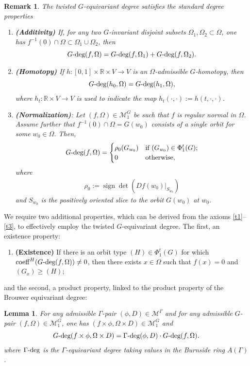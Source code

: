 \documentclass[twoside,11pt]{article}
\def\br{{\mathbb{R}}}
\def\gdeg{G\text{\rm -deg}}
\def\Om{\Omega}
\newtheorem{lemma}[theorem]{Lemma}
\newtheorem{remark}[theorem]{Remark}
\begin{document}
\begin{remark} \rm
The twisted $G$-equivariant degree satisfies the standard degree properties
\begin{enumerate}[label=($T_\arabic*$)]
\item\label{t1} {\bf (Additivity)} If, for any two $G$-invariant disjoint subsets $\Om_1,\Om_2 \subset \Om$, one has $f^{-1}(0) \cap \Om \subset \Om_1 \cup \Om_2$, then
\[
\gdeg(f,\Om) = \gdeg(f,\Om_1) + \gdeg(f,\Om_2).
\]
\item\label{t2} {\bf (Homotopy)} If $h: [0,1] \times \br \times V \rightarrow V$ is an $\Om$-admissible $G$-homotopy, then
\[
\gdeg(h_0,\Om) = \gdeg(h_1,\Om),
\]
where $h_t: \br \times V \rightarrow V$ is used to indicate the map $h_t(\cdot, \cdot) := h(t, \cdot,\cdot)$.
\item\label{t3}
{\bf (Normalization)}: Let $(f, \Omega) \in \mathcal{M}_1^{G}$ be such that $f$ is regular normal in $\Omega$. Assume further that $f^{-1}(0) \cap \Omega = G(w_0)$ consists of a single orbit for some $w_0 \in \Omega$. Then,
\begin{align*}
    \gdeg(f, \Omega) =
    \begin{cases}
    \rho_0 (G_{w_0}) & \text{if } (G_{w_0}) \in \Phi_1^t(G); \\
    0 & \text{otherwise},
    \end{cases}    
\end{align*}
where 
\begin{align}\label{def:orbit_index_ch2}
  \rho_0 := \operatorname{sign} \det(Df(w_0)|_{S_{w_0}})  
\end{align}
and $S_{w_0}$ is the positively oriented slice to the orbit $G(w_0)$ at $w_0$.
\end{enumerate}
\end{remark}
We require two additional properties, which can be derived from the axioms \ref{t1}--\ref{t3}, to effectively employ the twisted $G$-equivariant degree. The first, an existence property:
\begin{enumerate}[label=($T_\arabic*$), start=4]
    \item\label{t4} \textbf{(Existence)} If there is an orbit type $(H) \in \Phi_1^t(G)$ for which $\operatorname{coeff}^H(\gdeg(f,\Om)) \neq 0$, then there exists $x \in \Om$ such that $f(x) = 0$ and $(G_x) \geq (H)$;
\end{enumerate}
and the second, a product property, linked to the product property of the Brouwer equivariant degree:
\begin{lemma} \rm \label{lemm:twisted_degree_product_property}
For any admissible $\Gamma$-pair $(\phi,D) \in \mathcal M^\Gamma$ and for any admissible $G$-pair $(f,\Om) \in \mathcal M^{G}_1$, one has $(f \times \phi, \Om \times D) \in \mathcal M^{G}_1$ and
\[
\gdeg(f \times \phi, \Om \times D) = \Gamma \text{\rm -deg}(\phi,D) \cdot \gdeg(f,\Om).
\]
where $ \Gamma \text{\rm -deg}$ is the $\Gamma$-equivariant degree taking values in the Burnside ring $A(\Gamma)$.
\end{lemma}
\end{document}
